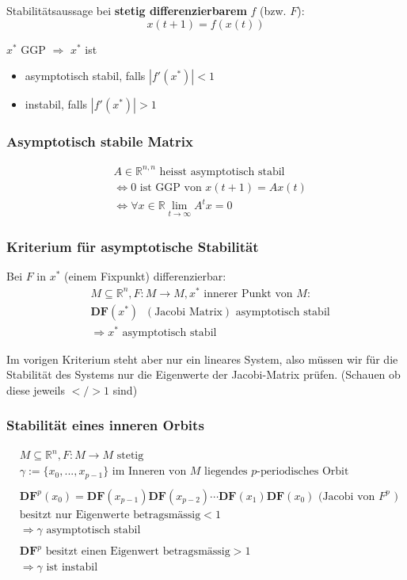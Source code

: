 \documentclass[a4paper]{article}
\newcommand{\R}{\mathbb{R}}
\begin{document}
Stabilitätsaussage bei \textbf{stetig differenzierbarem} $f$ (bzw. $F$):
\[
	x(t+1) = f(x(t))
\] 

$x ^{*}$ GGP $\Rightarrow$ $x ^{*}$ ist
\begin{itemize}
	\item asymptotisch stabil, falls $| f' (x ^{*}) | < 1$
	\item instabil, falls $| f'(x ^{*}) | > 1$
\end{itemize}

\subsubsection{Asymptotisch stabile Matrix}
\begin{align*}
	& A \in \R ^{n, n} \text{ heisst asymptotisch stabil } \\
	&\Leftrightarrow 0 \text{ ist GGP von } x(t+1) = A x(t) \\
	&\Leftrightarrow \forall x \in \R \lim_{t \to \infty} A ^{t} x = 0
\end{align*}

\subsubsection{Kriterium für asymptotische Stabilität}
Bei $F$ in $x ^{*}$ (einem Fixpunkt) differenzierbar:
\begin{align*}
	& M \subseteq \R ^{n}, F: M \rightarrow M,
	x ^{*} \text{ innerer Punkt von } M: \\
	& \textbf{DF} (x ^{*}) \;\; (\text{Jacobi Matrix}) \text{ asymptotisch stabil} \\
	&\Rightarrow x ^{*} \text{ asymptotisch stabil}
\end{align*}

Im vorigen Kriterium steht aber nur ein lineares System, also müssen
wir für die Stabilität des Systems nur die Eigenwerte der Jacobi-Matrix
prüfen. (Schauen ob diese jeweils $</> 1$ sind)

\subsubsection{Stabilität eines inneren Orbits }

\begin{align*}
	& M \subseteq \R ^{n}, F: M \rightarrow M \text{ stetig } \\
	& \gamma := \{
		x_0, ..., x_{p-1}
	\} \text{ im Inneren von $M$ liegendes $p$-periodisches Orbit } \\
	& \\
	& \textbf{DF}^{p} (x_0) =
	\textbf{DF} (x_{p-1})
	\textbf{DF} (x_{p-2})
	\cdots
	\textbf{DF} (x_1)
	\textbf{DF} (x_0) \text{ (Jacobi von $F ^{p}$ ) }
	\\
	& \text{besitzt nur Eigenwerte betragsmässig} < 1 \\
	&\Rightarrow \gamma \text{ asymptotisch stabil } \\
	& \\
	& \textbf{DF}^{p} \text{ besitzt einen Eigenwert betragsmässig}>1  \\
	&\Rightarrow \gamma \text{ ist instabil }
\end{align*}
\end{document}
